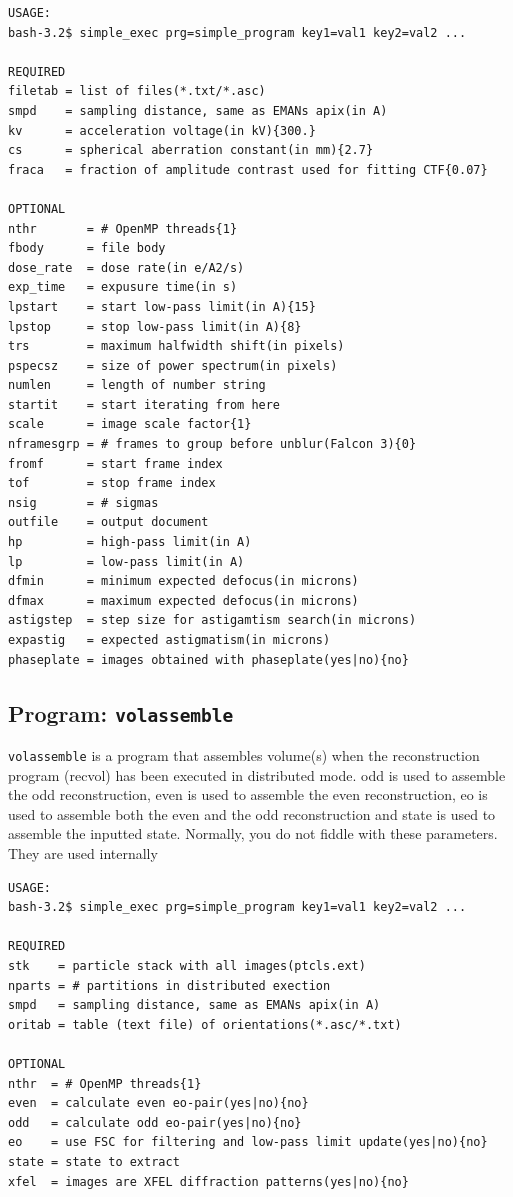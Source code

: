 \documentclass[a4paper,11pt]{article}
\newcommand{\prgname}[1]{\textcolor{NavyBlue}{\texttt{#1}}}
\begin{document}
\begin{verbatim}
USAGE:
bash-3.2$ simple_exec prg=simple_program key1=val1 key2=val2 ...

REQUIRED
filetab = list of files(*.txt/*.asc)
smpd    = sampling distance, same as EMANs apix(in A)
kv      = acceleration voltage(in kV){300.}
cs      = spherical aberration constant(in mm){2.7}
fraca   = fraction of amplitude contrast used for fitting CTF{0.07}

OPTIONAL
nthr       = # OpenMP threads{1}
fbody      = file body
dose_rate  = dose rate(in e/A2/s)
exp_time   = expusure time(in s)
lpstart    = start low-pass limit(in A){15}
lpstop     = stop low-pass limit(in A){8}
trs        = maximum halfwidth shift(in pixels)
pspecsz    = size of power spectrum(in pixels)
numlen     = length of number string
startit    = start iterating from here
scale      = image scale factor{1}
nframesgrp = # frames to group before unblur(Falcon 3){0}
fromf      = start frame index
tof        = stop frame index
nsig       = # sigmas
outfile    = output document
hp         = high-pass limit(in A)
lp         = low-pass limit(in A)
dfmin      = minimum expected defocus(in microns)
dfmax      = maximum expected defocus(in microns)
astigstep  = step size for astigamtism search(in microns)
expastig   = expected astigmatism(in microns)
phaseplate = images obtained with phaseplate(yes|no){no}
\end{verbatim}

\subsection{Program: \prgname{volassemble}}
\label{volassemble}
\prgname{volassemble} is a program that assembles volume(s) when the reconstruction program (recvol) has been executed in distributed mode. odd is used to assemble the odd reconstruction, even is used to assemble the even reconstruction, eo is used to assemble both the even and the odd reconstruction and state is used to assemble the inputted state. Normally, you do not fiddle with these parameters. They are used internally

\begin{verbatim}
USAGE:
bash-3.2$ simple_exec prg=simple_program key1=val1 key2=val2 ...

REQUIRED
stk    = particle stack with all images(ptcls.ext)
nparts = # partitions in distributed exection
smpd   = sampling distance, same as EMANs apix(in A)
oritab = table (text file) of orientations(*.asc/*.txt)

OPTIONAL
nthr  = # OpenMP threads{1}
even  = calculate even eo-pair(yes|no){no}
odd   = calculate odd eo-pair(yes|no){no}
eo    = use FSC for filtering and low-pass limit update(yes|no){no}
state = state to extract
xfel  = images are XFEL diffraction patterns(yes|no){no}
\end{verbatim}
\end{document}
